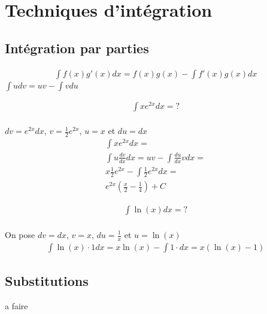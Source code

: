 \chapter{Techniques d'intégration}
\section{Intégration par parties}
\begin{myDefinition}
	\begin{eqnarray}
		\int f(x)g'(x)dx=f(x)g(x)-\int f'(x)g(x)dx
	\end{eqnarray}
	$\int udv=uv-\int vdu$
\end{myDefinition}
\begin{myExample}
	\begin{eqnarray*}
		\int xe^{2x}dx=?
	\end{eqnarray*}
	\\
	$dv=e^{2x}dx$, $v=\frac{1}{2}e^{2x}$, $u=x$ et $du=dx$
	\begin{eqnarray*}
		\int xe^{2x}dx=
		\\
		\int u\frac{dv}{dx}dx=uv-\int\frac{du}{dx}vdx=
		\\
		x\frac{1}{2}e^{2x}-\int \frac{1}{2}e^{2x}dx=
		\\e^{2x}\left(\frac{x}{2}-\frac{1}{4}\right)+C
	\end{eqnarray*}
\end{myExample}
\begin{myExample}
	\begin{eqnarray*}
		\int\ln{(x)}dx=?
	\end{eqnarray*}
	\\
	On pose $dv=dx$, $v=x$, $du=\frac{1}{x}$ et $u=\ln{(x)}$
	\begin{eqnarray*}
		\int\ln{(x)}\cdot 1dx=x\ln{(x)}-\int1\cdot dx=x(\ln{(x)}-1)
	\end{eqnarray*}
\end{myExample}
\section{Substitutions}
a faire
